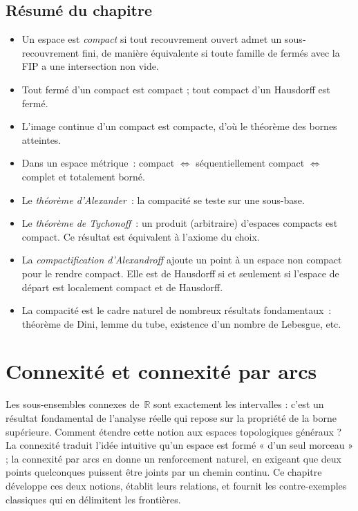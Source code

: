 \documentclass[12pt,a4paper,openany]{book}
\theoremstyle{definition}
\theoremstyle{cours}
\theoremstyle{coursnormal}
\begin{document}
\section*{Résumé du chapitre}\label{sec:resume-compacite}

\begin{itemize}
  \item Un espace est \emph{compact} si tout recouvrement ouvert admet un
    sous-recouvrement fini, de manière équivalente si toute famille de fermés
    avec la FIP a une intersection non vide.
  \item Tout fermé d'un compact est compact ; tout compact d'un Hausdorff est
    fermé.
  \item L'image continue d'un compact est compacte, d'où le théorème des bornes
    atteintes.
  \item Dans un espace métrique~: compact $\Leftrightarrow$ séquentiellement
    compact $\Leftrightarrow$ complet et totalement borné.
  \item Le \emph{théorème d'Alexander}~: la compacité se teste sur une
    sous-base.
  \item Le \emph{théorème de Tychonoff}~: un produit (arbitraire) d'espaces
    compacts est compact. Ce résultat est équivalent à l'axiome du choix.
  \item La \emph{compactification d'Alexandroff} ajoute un point à un espace
    non compact pour le rendre compact. Elle est de Hausdorff si et seulement
    si l'espace de départ est localement compact et de Hausdorff.
  \item La compacité est le cadre naturel de nombreux résultats fondamentaux~:
    théorème de Dini, lemme du tube, existence d'un nombre de Lebesgue, etc.
\end{itemize}

\chapter{Connexité et connexité par arcs}
\label{chap:connexite}

\medskip
\noindent
Les sous-ensembles connexes de~$\mathbb{R}$ sont exactement les intervalles : c'est un
résultat fondamental de l'analyse réelle qui repose sur la propriété de la borne
supérieure. Comment étendre cette notion aux espaces topologiques généraux ?
La connexité traduit l'idée intuitive qu'un espace est formé « d'un seul
morceau » ; la connexité par arcs en donne un renforcement naturel, en exigeant
que deux points quelconques puissent être joints par un chemin continu.
Ce chapitre développe ces deux notions, établit leurs relations, et fournit
les contre-exemples classiques qui en délimitent les frontières.
\end{document}
